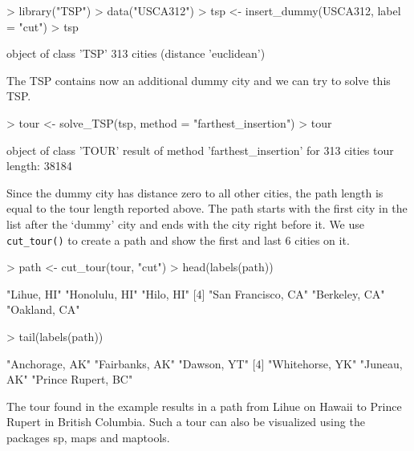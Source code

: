 \documentclass[10pt,a4paper,fleqn]{article}
\newcommand{\strong}[1]{{\normalfont\fontseries{b}\selectfont #1}}
\newcommand{\func}[1]{\mbox{\texttt{#1()}}}
\newcommand{\pkg}[1]{\strong{#1}}
\begin{document}
\begin{Schunk}
\begin{Sinput}
> library("TSP")
> data("USCA312")
> tsp <- insert_dummy(USCA312, label = "cut")
> tsp
\end{Sinput}
\begin{Soutput}
object of class 'TSP' 
313 cities (distance 'euclidean') 
\end{Soutput}
\end{Schunk}

The TSP contains now an additional dummy city and we can try to solve this
TSP.

\begin{Schunk}
\begin{Sinput}
> tour <- solve_TSP(tsp, method = "farthest_insertion")
> tour
\end{Sinput}
\begin{Soutput}
object of class 'TOUR' 
result of method 'farthest_insertion' for 313 cities
tour length: 38184 
\end{Soutput}
\end{Schunk}

Since the dummy city has distance zero to all other cities, the path length is
equal to the tour length reported above. The path starts with the first city in
the list after the `dummy' city  and ends with the city right before it. 
We use \func{cut\_tour} to create a path and show the 
first and last 6 cities on it.

\begin{Schunk}
\begin{Sinput}
> path <- cut_tour(tour, "cut")
> head(labels(path))
\end{Sinput}
\begin{Soutput}
[1] "Lihue, HI"         "Honolulu, HI"      "Hilo, HI"         
[4] "San Francisco, CA" "Berkeley, CA"      "Oakland, CA"      
\end{Soutput}
\begin{Sinput}
> tail(labels(path))
\end{Sinput}
\begin{Soutput}
[1] "Anchorage, AK"     "Fairbanks, AK"     "Dawson, YT"       
[4] "Whitehorse, YK"    "Juneau, AK"        "Prince Rupert, BC"
\end{Soutput}
\end{Schunk}

The tour found in the example results in a path from Lihue on Hawaii to Prince
Rupert in British Columbia. Such a tour can also be visualized using the
packages \pkg{sp}, \pkg{maps} and \pkg{maptools}.
\end{document}

